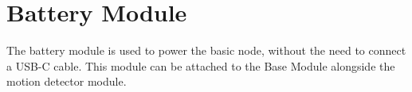 \section{Battery Module} 

The battery module is used to power the basic node, without the need
to connect a USB-C cable. This module can be attached to the Base Module 
alongside the motion detector module. 




